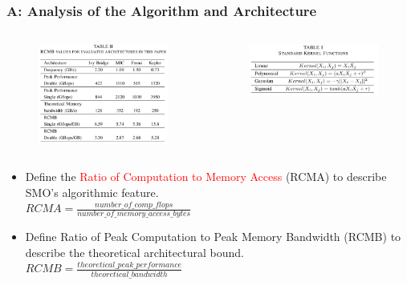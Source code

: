 \documentclass{beamer}
\begin{document}
\begin{frame}
	\frametitle{A: Analysis of the Algorithm and Architecture}
	\begin{columns}[c] %
		
		\begin{figure}
		\includegraphics[width=0.8\textwidth]{figs/table2_rcmb.png}
			
		\end{figure}
		
			\includegraphics[width=0.8\textwidth]{figs/table1_kernel.png}
				

	\end{columns}	
	\begin{itemize}
		\item Define the \textcolor{red}{Ratio of Computation to Memory Access}
		(RCMA) to describe SMO’s algorithmic feature. \\
		$RCMA=\frac{number\_of\_comp\_flops}{number\_of\_memory\_access\_bytes}$
		\item Define Ratio of Peak Computation to Peak Memory Bandwidth (RCMB)
		to describe the theoretical architectural bound. \\ 
		$RCMB=\frac{theoretical\_peak\_performance}{theoretical\_bandwidth}$		
	\end{itemize}	
\end{frame}
\end{document}
